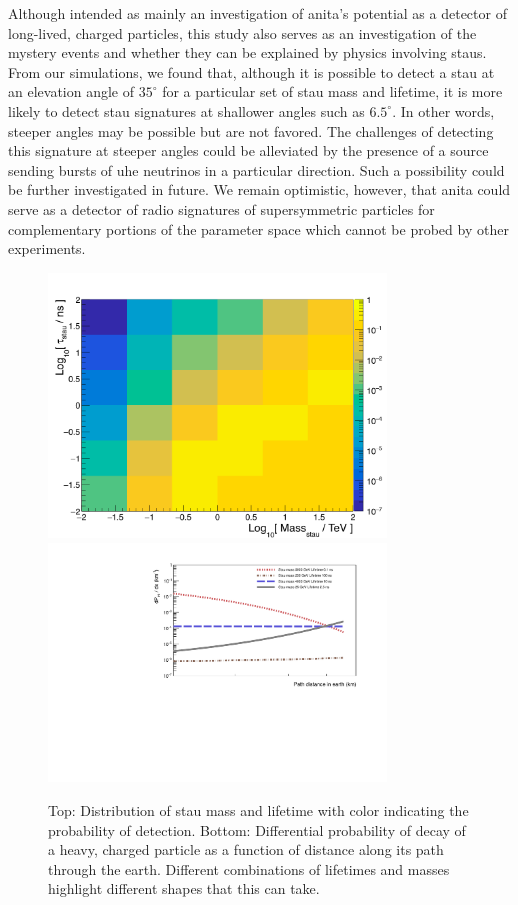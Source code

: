 Although intended as mainly an investigation of \gls{anita}'s potential as a detector of long-lived, charged particles, this study also serves as 
an investigation of the mystery events and whether they can be explained by physics involving staus. 
From our simulations, we found that, although it is possible to detect a stau at an elevation angle of $35^{\circ}$ for a particular set of stau mass and lifetime, it is more likely to detect stau signatures at shallower angles such as $6.5^{\circ}$. In other words, steeper angles may be possible but are not favored. The challenges of detecting this signature at steeper angles could be alleviated by the presence of a source sending bursts of \gls{uhe} neutrinos in a particular direction. Such a possibility could be further investigated in future. We remain optimistic, however, that \gls{anita} could serve as a detector of radio signatures of supersymmetric particles for complementary portions of the parameter space which cannot be probed by other experiments. 

\begin{figure}
\centering
\includegraphics[width=0.8\textwidth]{figures/6_forthesis.png}
\includegraphics[width=0.8\textwidth]{figures/bragg_like_thesis.pdf}
\caption{Top: Distribution of stau mass and lifetime with color indicating the probability of detection. Bottom: Differential probability of decay of a heavy, charged particle as a function of distance along its path through the earth.  Different 
combinations of lifetimes and masses highlight different shapes that this can take.}
\label{stau_plots}
\end{figure}


